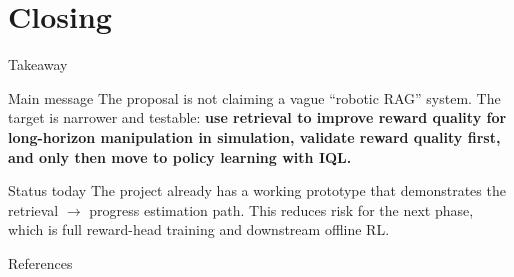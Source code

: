 \documentclass[aspectratio=169,11pt]{beamer}
\begin{document}
\section{Closing}
\begin{frame}[t]{Takeaway}
\small
\begin{block}{Main message}
The proposal is not claiming a vague ``robotic RAG'' system. The target is narrower and testable:
\textbf{use retrieval to improve reward quality for long-horizon manipulation in simulation, validate reward quality first, and only then move to policy learning with IQL.}
\end{block}

\begin{block}{Status today}
The project already has a working prototype that demonstrates the retrieval $\rightarrow$ progress estimation path.
This reduces risk for the next phase, which is full reward-head training and downstream offline RL.
\end{block}
\end{frame}

\begin{frame}[allowframebreaks]{References}
\tiny


\end{frame}
\end{document}
